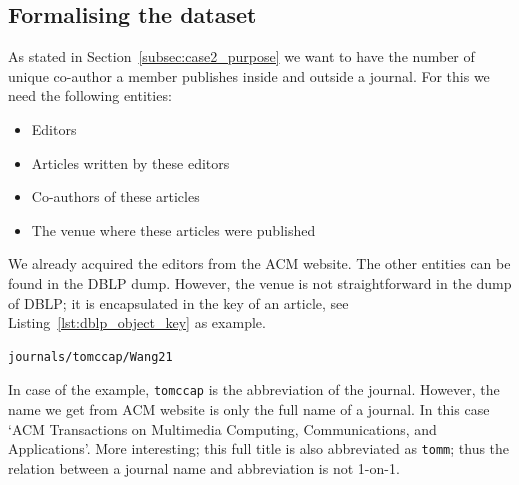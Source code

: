 \documentclass{ou-report}
\newcommand{\dblp}{DBLP}
\begin{document}
\subsection{Formalising the dataset}
As stated in Section~\ref{subsec:case2_purpose} we want to have the number of
unique co-author a member publishes inside and outside a journal. For this we
need the following entities:
\begin{itemize}
    \item Editors
    \item Articles written by these editors
    \item Co-authors of these articles
    \item The venue where these articles were published
\end{itemize}

We already acquired the editors from the ACM website. The other entities can be 
found in the \dblp{} dump. 
However, the venue is not straightforward in the dump of \dblp{}; it is 
encapsulated in the key of an article, see Listing~\ref{lst:dblp_object_key} 
as example.

\lstset{language=XML}
\begin{lstlisting}[caption={Example DBLP key},label={lst:dblp_object_key}]
journals/tomccap/Wang21
\end{lstlisting}

In case of the example, \verb|tomccap| is the abbreviation of the journal.
However, the name we get from ACM website is only the full name of a journal. In
this case `ACM Transactions on Multimedia Computing, Communications, and
Applications'. More interesting; this full title is also abbreviated as
\verb|tomm|; thus the relation between a journal name and abbreviation is not
1-on-1.

\end{document}
